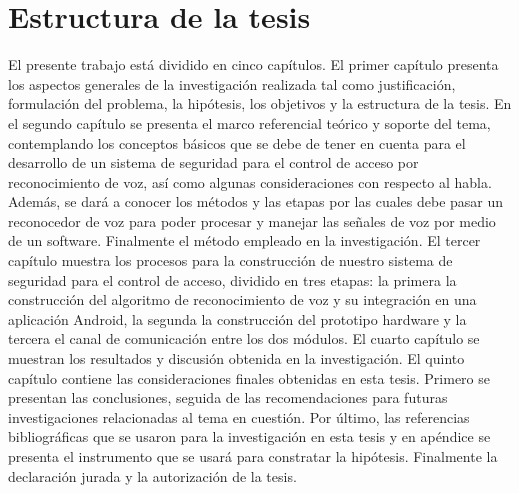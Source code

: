 \section{Estructura de la tesis}
El presente trabajo está dividido en cinco capítulos. El primer capítulo presenta los aspectos generales de la investigación realizada tal como justificación, formulación del problema, la hipótesis, los objetivos y la estructura de la tesis.
\vskip 0.5cm
En el segundo capítulo se presenta el marco referencial teórico y soporte del tema, contemplando los conceptos básicos que se debe de tener en cuenta para el desarrollo de un sistema de seguridad para el control de acceso por reconocimiento de voz, así como algunas consideraciones con respecto al habla. Además, se dará a conocer los métodos y las etapas por las cuales debe pasar un reconocedor de voz para poder procesar y manejar las señales de voz por medio de un software. Finalmente el método empleado en la investigación.
\vskip 0.5cm
El tercer capítulo muestra los procesos para la construcción de nuestro sistema de seguridad para el control de acceso, dividido en tres etapas: la primera la construcción del algoritmo de reconocimiento de voz y su integración en una aplicación Android, la segunda la construcción del prototipo hardware y la tercera el canal de comunicación entre los dos módulos.
\vskip 0.5cm
El cuarto capítulo se muestran los resultados y discusión obtenida en la investigación. El quinto capítulo contiene las consideraciones finales obtenidas en esta tesis. Primero se presentan las conclusiones, seguida de las recomendaciones para futuras investigaciones relacionadas al tema en cuestión. 
\vskip 0.5cm
Por último, las referencias bibliográficas que se usaron para la investigación en esta tesis y en apéndice se presenta el instrumento que se usará para constratar la hipótesis. Finalmente la declaración jurada y la autorización de la tesis.